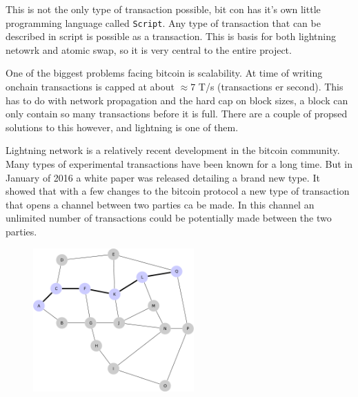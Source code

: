 This is not the only type of transaction possible, bit con has it's own little programming language called \texttt{Script}. Any type of transaction that can be described in script is possible as a transaction. This is basis for both lightning netowrk and atomic swap, so it is very central to the entire project. 

One of the biggest problems facing bitcoin is scalability. At time of writing onchain transactions is capped at about $\approx 7$ T/s (transactions er second). This has to do with network propagation and the hard cap on block sizes, a block can only contain so many transactions before it is full. There are a couple of propsed solutions to this however, and lightning is one of them. 

Lightning network is a relatively recent development in the bitcoin community. Many types of experimental transactions have been known for a long time. But in January of 2016 a white paper was released detailing a brand new type. It showed that with a few changes to the bitcoin protocol a new type of transaction that opens a channel between two parties ca be made. In this channel an unlimited number of transactions could be potentially made between the two parties. 

\begin{figure}[H]
	\centering
	\includegraphics[width=0.55\textwidth]{introduction/images/mesh_network.png}
	\caption{}
	\label{fig:blockchain2}
\end{figure}

